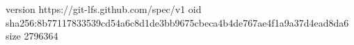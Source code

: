 version https://git-lfs.github.com/spec/v1
oid sha256:8b77117833539cd54a6c8d1de3bb9675cbeca4b4de767ae4f1a9a37d4ead8da6
size 2796364
